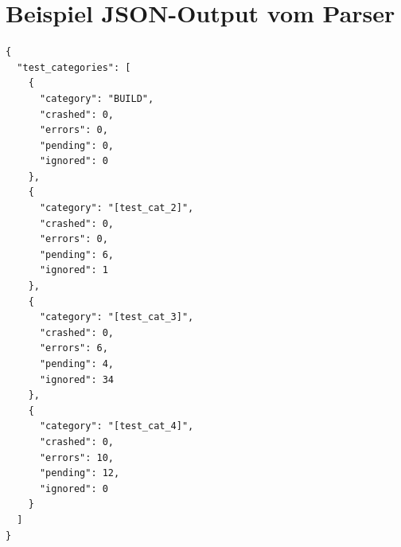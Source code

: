 \newpage
\section{Beispiel JSON-Output vom Parser}
\label{Add:Dashboard:JSON}
\begin{lstlisting}[breaklines]
{
  "test_categories": [
    {
      "category": "BUILD",
      "crashed": 0,
      "errors": 0,
      "pending": 0,
      "ignored": 0
    },
    {
      "category": "[test_cat_2]",
      "crashed": 0,
      "errors": 0,
      "pending": 6,
      "ignored": 1
    },
    {
      "category": "[test_cat_3]",
      "crashed": 0,
      "errors": 6,
      "pending": 4,
      "ignored": 34
    },
    {
      "category": "[test_cat_4]",
      "crashed": 0,
      "errors": 10,
      "pending": 12,
      "ignored": 0
    }
  ]
}
\end{lstlisting}